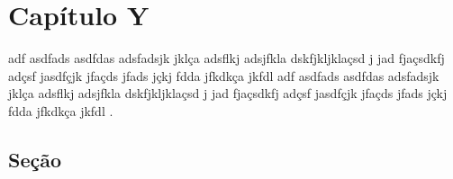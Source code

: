 \chapter{Capítulo Y}
\label{cap:capY}

adf asdfads asdfdas adsfadsjk  jklça adsflkj adsjfkla dskfjkljklaçsd j  jad fjaçsdkfj adçsf jasdfçjk jfaçds jfads jçkj fdda jfkdkça jkfdl adf asdfads asdfdas adsfadsjk  jklça adsflkj adsjfkla dskfjkljklaçsd j  jad fjaçsdkfj adçsf jasdfçjk jfaçds jfads jçkj fdda jfkdkça jkfdl .


\section{Seção}